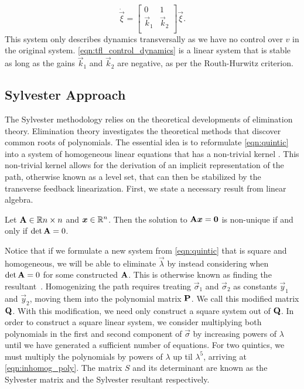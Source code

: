 \begin{equation}
    \dot{\vec{\xi}}
    =
    \begin{bmatrix}
        0 & 1\\
        \vec{k}_1 & \vec{k}_2 \\
    \end{bmatrix}
    \vec{\xi}.
    \label{eqn:tfl_control_dynamics}
\end{equation}
This system only describes dynamics transversally as we have no control over $v$ in the original system. \eqref{eqn:tfl_control_dynamics} is a linear system that is stable as long as the gains $\vec{k}_1$ and $\vec{k}_2$ are negative, as per the Routh-Hurwitz criterion.

\subsection{Sylvester Approach}
The Sylvester methodology relies on the theoretical developments of elimination theory. Elimination theory investigates the theoretical methods that discover common roots of polynomials. The essential idea is to reformulate \eqref{eqn:quintic} into a system of homogeneous linear equations that has a non-trivial kernel \cite{Sederberg84}. This non-trivial kernel allows for the derivation of an implicit representation of the path, otherwise known as a level set, that can then be stabilized by the transverse feedback linearization. First, we state a necessary result from linear algebra.
\begin{theorem}
    Let $\mathbf{A}\in\mathbb{R}{n\times n}$ and $\bm{x}\in\mathbb{R}^n$. Then the solution to $\mathbf{A}\bm{x}=\bm{0}$ is non-unique if and only if $\det\mathbf{A}=0$. \label{thm:kernel}
\end{theorem}
Notice that if we formulate a new system from \eqref{eqn:quintic} that is square and homogeneous, we will be able to eliminate $\vec{\lambda}$ by instead considering when $\det\mathbf{A}=0$ for some constructed $\mathbf{A}$. This is otherwise known as finding the resultant~\cite{Sederberg84}. Homogenizing the path requires treating $\vec{\sigma}_1$ and $\vec{\sigma}_2$ as constants $\vec{y}_1$ and $\vec{y}_2$, moving them into the polynomial matrix $\mathbf{P}$. We call this modified matrix $\mathbf{Q}$. With this modification, we need only construct a square system out of $\mathbf{Q}$. In order to construct a square linear system, we consider multiplying both polynomials in the first and second component of $\vec{\sigma}$ by increasing powers of $\lambda$ until we have generated a sufficient number of equations. For two quintics, we must multiply the polynomials by powers of $\lambda$ up til $\lambda^5$, arriving at \eqref{eqn:inhomog_poly}. The matrix $S$ and its determinant are known as the Sylvester matrix and the Sylvester resultant respectively.
